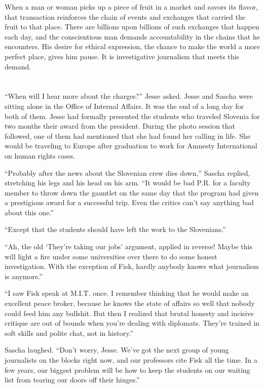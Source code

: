 \documentclass[12pt]{book}
\begin{document}
When a man or woman picks up a piece of fruit in a market and savors its flavor, that transaction reinforces the chain of events and exchanges that carried the fruit to that place.  There are billions upon billions of such exchanges that happen each day, and the conscientious man demands accountability in the chains that he encounters.  His desire for ethical expression, the chance to make the world a more perfect place, gives him pause.  It is investigative journalism that meets this demand.

\chapter{}

``When will I hear more about the charges?'' Jesse asked.  Jesse and Sascha were sitting alone in the Office of Internal Affairs.  It was the end of a long day for both of them.  Jesse had formally presented the students who traveled Slovenia for two months their award from the president.  During the photo session that followed, one of them had mentioned that she had found her calling in life.  She would be traveling to Europe after graduation to work for Amnesty International on human rights cases.

``Probably after the news about the Slovenian crew dies down,'' Sascha replied, stretching his legs and his head on his arm.  ``It would be bad P.R. for a faculty member to throw down the gauntlet on the same day that the program had given a prestigious award for a successful trip.  Even the critics can't say anything bad about this one.''

``Except that the students should have left the work to the Slovenians.''

``Ah, the old `They're taking our jobs' argument, applied in reverse!  Maybe this will light a fire under some universities over there to do some honest investigation.  With the exception of Fisk, hardly anybody knows what journalism is anymore.''

``I saw Fisk speak at M.I.T. once.  I remember thinking that he would make an excellent peace broker, because he knows the state of affairs so well that nobody could feed him any bullshit.  But then I realized that brutal honesty and incisive critique are out of bounds when you're dealing with diplomats.  They're trained in soft skills and polite chat, not in history.''

Sascha laughed.  ``Don't worry, Jesse.  We've got the next group of young journalists on the blocks right now, and our professors cite Fisk all the time.  In a few years, our biggest problem will be how to keep the students on our waiting list from tearing our doors off their hinges.''
\end{document}
